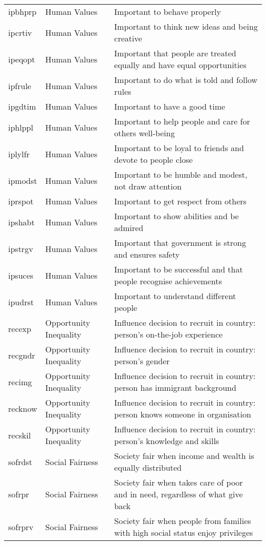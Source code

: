 \begin{longtable}{p{1.2cm}p{3.2cm}p{6cm}}
	ipbhprp & Human Values & Important to behave properly \\
	ipcrtiv & Human Values & Important to think new ideas and being creative \\
	ipeqopt & Human Values & Important that people are treated equally and have equal opportunities \\
	ipfrule & Human Values & Important to do what is told and follow rules \\
	ipgdtim & Human Values & Important to have a good time \\
	iphlppl & Human Values & Important to help people and care for others well-being \\
	iplylfr & Human Values & Important to be loyal to friends and devote to people close \\
	ipmodst & Human Values & Important to be humble and modest, not draw attention \\
	iprspot & Human Values & Important to get respect from others \\
	ipshabt & Human Values & Important to show abilities and be admired \\
	ipstrgv & Human Values & Important that government is strong and ensures safety \\
	ipsuces & Human Values & Important to be successful and that people recognise achievements \\
	ipudrst & Human Values & Important to understand different people \\
	recexp & Opportunity Inequality & Influence decision to recruit in country: person's on-the-job experience \\
	recgndr & Opportunity Inequality & Influence decision to recruit in country: person's gender \\
	recimg & Opportunity Inequality & Influence decision to recruit in country: person has immigrant background \\
	recknow & Opportunity Inequality & Influence decision to recruit in country: person knows someone in organisation \\
	recskil & Opportunity Inequality & Influence decision to recruit in country: person's knowledge and skills \\
	sofrdst & Social Fairness & Society fair when income and wealth is equally distributed \\
	sofrpr & Social Fairness & Society fair when takes care of poor and in need, regardless of what give back \\
	sofrprv & Social Fairness & Society fair when people from families with high social status enjoy privileges \\

\end{longtable}
